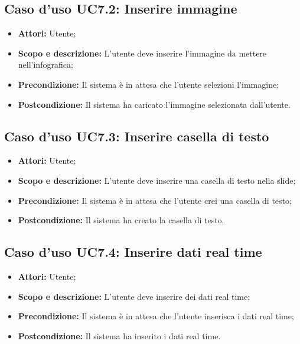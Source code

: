 \subsection{Caso d'uso UC7.2: Inserire immagine}
\begin{itemize}
\item \textbf{Attori:} Utente;
\item \textbf{Scopo e descrizione:} L'utente deve inserire l'immagine da mettere nell'infografica;
\item \textbf{Precondizione:} Il sistema è in attesa che l'utente selezioni l'immagine;
\item \textbf{Postcondizione:} Il sistema ha caricato l'immagine selezionata dall'utente.
\end{itemize}


\subsection{Caso d'uso UC7.3: Inserire casella di testo}
\begin{itemize}
\item \textbf{Attori:} Utente;
\item \textbf{Scopo e descrizione:} L'utente deve inserire una casella di testo nella slide;
\item \textbf{Precondizione:} Il sistema è in attesa che l'utente crei una casella di testo;
\item \textbf{Postcondizione:} Il sistema ha creato la casella di testo.
\end{itemize}


\subsection{Caso d'uso UC7.4: Inserire dati real time}
\begin{itemize}
	\item \textbf{Attori:} Utente;
	\item \textbf{Scopo e descrizione:} L'utente deve inserire dei dati \gls{real time};
	\item \textbf{Precondizione:} Il sistema è in attesa che l'utente inserisca i dati \gls{real time};
	\item \textbf{Postcondizione:} Il sistema ha inserito i dati \gls{real time}.
\end{itemize}


